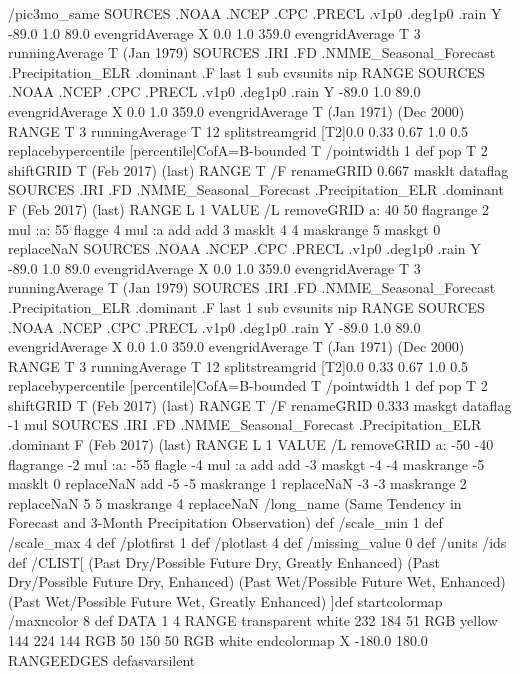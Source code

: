 \begin{ingrid}
/pic3mo_same {
 SOURCES .NOAA .NCEP .CPC .PRECL .v1p0 .deg1p0 .rain
  Y -89.0 1.0 89.0 evengridAverage
  X 0.0 1.0 359.0 evengridAverage
  T 3 runningAverage
  T (Jan 1979) SOURCES .IRI .FD .NMME_Seasonal_Forecast .Precipitation_ELR .dominant .F
     last
      1 sub
      cvsunits nip RANGE
  SOURCES .NOAA .NCEP .CPC .PRECL .v1p0 .deg1p0 .rain
   Y -89.0 1.0 89.0 evengridAverage
   X 0.0 1.0 359.0 evengridAverage
   T (Jan 1971) (Dec 2000) RANGE
   T 3 runningAverage
   T 12 splitstreamgrid
   [T2]0.0 0.33 0.67 1.0 0.5 replacebypercentile
   [percentile]CofA=B-bounded
  T
   /pointwidth 1 def
   pop
  T 2 shiftGRID
  T (Feb 2017) (last) RANGE
  T /F renameGRID
  0.667 masklt
  dataflag
  SOURCES .IRI .FD .NMME_Seasonal_Forecast .Precipitation_ELR .dominant
   F (Feb 2017) (last) RANGE
   L 1 VALUE
   /L removeGRID
   a:
     40 50 flagrange
     2 mul
     :a:
      55 flagge
      4 mul
      :a
    add
   add
  3 masklt
  4 4 maskrange
  5 maskgt
  0 replaceNaN
  SOURCES .NOAA .NCEP .CPC .PRECL .v1p0 .deg1p0 .rain
   Y -89.0 1.0 89.0 evengridAverage
   X 0.0 1.0 359.0 evengridAverage
   T 3 runningAverage
   T (Jan 1979) SOURCES .IRI .FD .NMME_Seasonal_Forecast .Precipitation_ELR .dominant .F
      last
       1 sub
       cvsunits nip RANGE
   SOURCES .NOAA .NCEP .CPC .PRECL .v1p0 .deg1p0 .rain
    Y -89.0 1.0 89.0 evengridAverage
    X 0.0 1.0 359.0 evengridAverage
    T (Jan 1971) (Dec 2000) RANGE
    T 3 runningAverage
    T 12 splitstreamgrid
    [T2]0.0 0.33 0.67 1.0 0.5 replacebypercentile
    [percentile]CofA=B-bounded
   T
    /pointwidth 1 def
    pop
   T 2 shiftGRID
   T (Feb 2017) (last) RANGE
   T /F renameGRID
   0.333 maskgt
   dataflag
   -1 mul
   SOURCES .IRI .FD .NMME_Seasonal_Forecast .Precipitation_ELR .dominant
    F (Feb 2017) (last) RANGE
    L 1 VALUE
    /L removeGRID
    a:
      -50 -40 flagrange
      -2 mul
      :a:
       -55 flagle
       -4 mul
       :a
     add
    add
   -3 maskgt
   -4 -4 maskrange
   -5 masklt
   0 replaceNaN
   add
  -5 -5 maskrange
  1 replaceNaN
  -3 -3 maskrange
  2 replaceNaN
  5 5 maskrange
  4 replaceNaN
  /long_name (Same Tendency in Forecast and 3-Month Precipitation Observation) def
  /scale_min 1 def
  /scale_max 4 def
  /plotfirst 1 def
  /plotlast 4 def
  /missing_value 0 def
  /units /ids def
  /CLIST[ (Past Dry/Possible Future Dry, Greatly Enhanced) (Past Dry/Possible Future Dry, Enhanced) (Past Wet/Possible Future Wet, Enhanced) (Past Wet/Possible Future Wet, Greatly Enhanced) ]def
  startcolormap
    /maxncolor 8 def
    DATA
    1 4 RANGE
    transparent white 232
       184 51 RGB
       yellow 144
         224 144 RGB
         50
          150 50 RGB
          white endcolormap
  X -180.0 180.0 RANGEEDGES
} defasvarsilent
\end{ingrid}
